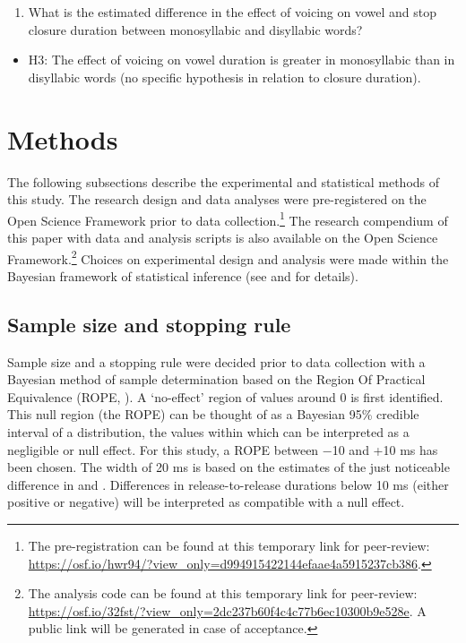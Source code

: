 \documentclass[
  12pt,
  a4paper,
  authoryear, 5p]{elsarticle}
\providecommand{\tightlist}{%
  \setlength{\itemsep}{0pt}\setlength{\parskip}{0pt}}
\begin{document}
\begin{enumerate}
\def\labelenumi{\arabic{enumi}.}
\setcounter{enumi}{2}
\tightlist
\item
  What is the estimated difference in the effect of voicing on vowel and
  stop closure duration between monosyllabic and disyllabic words?
\end{enumerate}

\begin{itemize}
\tightlist
\item
  H3: The effect of voicing on vowel duration is greater in monosyllabic
  than in disyllabic words (no specific hypothesis in relation to
  closure duration).
\end{itemize}

\hypertarget{methods}{%
\section{Methods}\label{methods}}

The following subsections describe the experimental and statistical
methods of this study. The research design and data analyses were
pre-registered on the Open Science Framework prior to data
collection.\footnote{The pre-registration can be found at this temporary link for peer-review: \url{https://osf.io/hwr94/?view_only=d994915422144efaae4a5915237cb386}.}
The research compendium of this paper with data \citep{coretta2019g} and
analysis scripts is also available on the Open Science
Framework.\footnote{The analysis code can be found at this temporary link for peer-review: \url{https://osf.io/32fst/?view_only=2dc237b60f4c4c77b6ec10300b9e528e}. A public link will be generated in case of acceptance.}
Choices on experimental design and analysis were made within the
Bayesian framework of statistical inference (see 
and  for details).

\hypertarget{sample-size-and-stopping-rule}{%
\subsection{Sample size and stopping
rule}\label{sample-size-and-stopping-rule}}

\label{s:sample-size}

Sample size and a stopping rule were decided prior to data collection
with a Bayesian method of sample determination based on the Region Of
Practical Equivalence (ROPE, \citealt{kruschke2015, vasishth2018a}). A
`no-effect' region of values around 0 is first identified. This null
region (the ROPE) can be thought of as a Bayesian 95\% credible interval
of a distribution, the values within which can be interpreted as a
negligible or null effect. For this study, a ROPE between −10 and +10 ms
has been chosen. The width of 20 ms is based on the estimates of the
just noticeable difference in \citet{huggins1972} and
\citet{nooteboom1980}. Differences in release-to-release durations below
10 ms (either positive or negative) will be interpreted as compatible
with a null effect.
\end{document}
